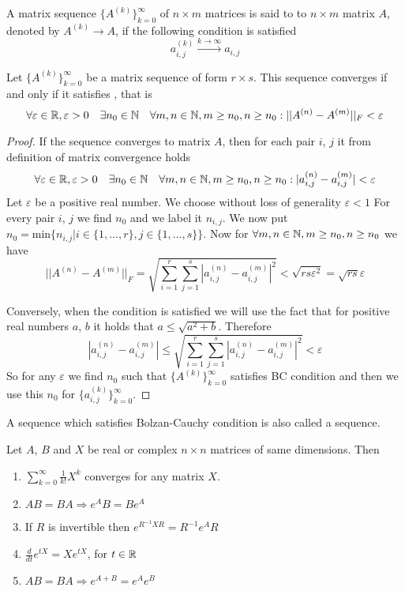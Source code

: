 \begin{definition}
	A matrix sequence $\{A^{(k)}\}_{k=0}^\infty$ of $n \times m$ matrices is said to  to $n\times m$ matrix $A$, denoted by $A^{(k)}\longrightarrow A$, if the following condition is satisfied $$a^{(k)}_{i,j}\xrightarrow{k\rightarrow\infty} a_{i,j}$$
\end{definition}

\begin{lemma}
	Let $\{A^{(k)}\}_{k=0}^\infty$ be a matrix sequence of form $r\times s$. This sequence converges if and only if it satisfies , that is $$\forall\varepsilon\in\mathbb{R}, \varepsilon>0\quad\exists n_0\in\mathbb{N}\quad\forall m,n\in\mathbb{N},m\geq n_0, n\geq n_0:||A^{(n)}-A^{(m)}||_F<\varepsilon$$
\end{lemma}

\begin{proof}
	If the sequence converges to matrix $A$, then for each pair $i$, $j$ it from definition of matrix convergence holds $$\forall \varepsilon\in\mathbb{R},\varepsilon>0\quad\exists n_0\in\mathbb{N}\quad\forall m,n\in\mathbb{N},m\geq n_0, n\geq n_0:|a^{(n)}_{i,j}-a_{i,j}^{(m)}|<\varepsilon$$ Let $\varepsilon$ be a positive real number. We choose without loss of generality $\varepsilon<1$ For every pair $i$, $j$ we find $n_0$ and we label it $n_{i,j}$. We now put $n_0=\text{min}\{n_{i,j}|i\in\{1,\ldots,r\},j\in\{1,\ldots,s\}\}$. Now for $\forall m,n\in\mathbb{N},m\geq n_0, n\geq n_0$ we have $$||A^{(n)}-A^{(m)}||_F=\sqrt{\sum^r_{i=1}\sum^s_{j=1}|a^{(n)}_{i,j}-a^{(m)}_{i,j}|^2}<\sqrt{rs\varepsilon^2}=\sqrt{rs}\varepsilon$$

	Conversely, when the condition is satisfied we will use the fact that for positive real numbers $a$, $b$ it holds that $a\leq\sqrt{a^2+b}$. Therefore $$|a^{(n)}_{i,j}-a_{i,j}^{(m)}|\leq\sqrt{\sum^r_{i=1}\sum^s_{j=1}|a^{(n)}_{i,j}-a^{(m)}_{i,j}|^2}<\varepsilon$$ So for any $\varepsilon$ we find $n_0$ such that $\{A^{(k)}\}_{k=0}^\infty$ satisfies BC condition and then we use this $n_0$ for $\{a^{(k)}_{i,j}\}_{k=0}^\infty$.
\end{proof}

\begin{remark}
	A sequence which satisfies Bolzan-Cauchy condition is also called  a  sequence.
\end{remark}

\begin{lemma}
\label{lem:expprop}
	Let $A$, $B$ and $X$ be real or complex $n\times n$ matrices of same dimensions. Then 
	\begin{enumerate}
		\item $\sum _{k=0}^{\infty}\frac{1}{k!}X^{k}$ converges for any matrix $X$.
		\item $AB = BA \Rightarrow e^{A}B = Be^{A}$
		\item If $R$ is invertible then $e^{R^{-1}XR}=R^{-1}e^AR$
		\item $\frac{d}{dt}e^{tX}=Xe^{tX}$, for $t \in \mathbb{R}$
		\item $AB = BA \Rightarrow e^{A+B} = e^{A}e^B$
	\end{enumerate}
\end{lemma}

